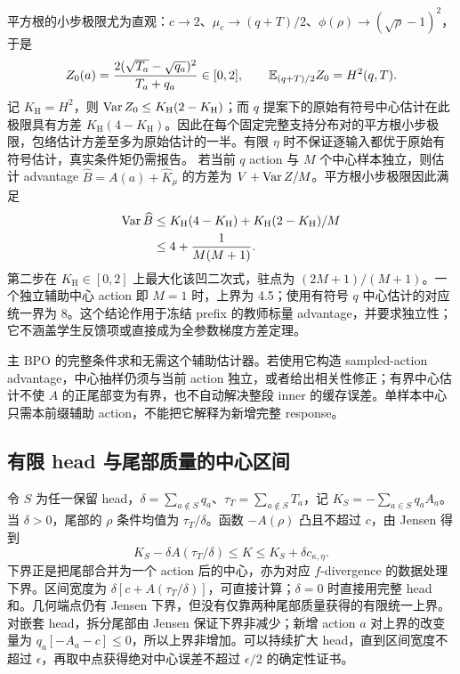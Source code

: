 平方根的小步极限尤为直观：$c\to2$、$\mu_c\to(q+T)/2$、$\phi(\rho)\to(\sqrt\rho-1)^2$，于是
\begin{equation}
 Z_0(a)=\frac{2(\sqrt{T_a}-\sqrt{q_a})^2}{T_a+q_a}\in[0,2],
 \qquad\mathbb E_{(q+T)/2}Z_0=H^2(q,T).
\end{equation}
记 $K_{\mathrm H}=H^2$，则 $\operatorname{Var} Z_0\le K_{\mathrm H}(2-K_{\mathrm H})$；而 $q$ 提案下的原始有符号中心估计在此极限具有方差 $K_{\mathrm H}(4-K_{\mathrm H})$。因此在每个固定完整支持分布对的平方根小步极限，包络估计方差至多为原始估计的一半。有限 $\eta$ 时不保证逐输入都优于原始有符号估计，真实条件矩仍需报告。 若当前 $q$ action 与 $M$ 个中心样本独立，则估计 advantage $\widehat B=A(a)+\widehat K_\mu$ 的方差为 $V+\operatorname{Var} Z/M$。平方根小步极限因此满足
\begin{align}
 \operatorname{Var}\widehat B
 &\le K_{\mathrm H}(4-K_{\mathrm H})
    +K_{\mathrm H}(2-K_{\mathrm H})/M\\
 &\le4+\frac1{M(M+1)}.
\end{align}
第二步在 $K_{\mathrm H}\in[0,2]$ 上最大化该凹二次式，驻点为 $(2M+1)/(M+1)$。一个独立辅助中心 action 即 $M=1$ 时，上界为 4.5；使用有符号 $q$ 中心估计的对应统一界为 8。这个结论作用于冻结 prefix 的教师标量 advantage，并要求独立性；它不涵盖学生反馈项或直接成为全参数梯度方差定理。


主 BPO 的完整条件求和无需这个辅助估计器。若使用它构造 sampled-action advantage，中心抽样仍须与当前 action 独立，或者给出相关性修正；有界中心估计不使 $A$ 的正尾部变为有界，也不自动解决整段 inner 的缓存误差。单样本中心只需本前缀辅助 action，不能把它解释为新增完整 response。
\subsection{有限 head 与尾部质量的中心区间}

令 $S$ 为任一保留 head，$\delta=\sum_{a\notin S}q_a$、$\tau_T=\sum_{a\notin S}T_a$，记 $K_S=-\sum_{a\in S}q_aA_a$。当 $\delta>0$，尾部的 $\rho$ 条件均值为 $\tau_T/\delta$。函数 $-A(\rho)$ 凸且不超过 $c$，由 Jensen 得到
\begin{equation}
 \boxed{K_S-\delta A(\tau_T/\delta)
 \le K\le K_S+\delta c_{\kappa,\eta}.}
 \label{eq:center-head-tail-interval}
\end{equation}
下界正是把尾部合并为一个 action 后的中心，亦为对应 $f$-divergence 的数据处理下界。区间宽度为 $\delta[c+A(\tau_T/\delta)]$，可直接计算；$\delta=0$ 时直接用完整 head 和。几何端点仍有 Jensen 下界，但没有仅靠两种尾部质量获得的有限统一上界。 对嵌套 head，拆分尾部由 Jensen 保证下界非减少；新增 action $a$ 对上界的改变量为 $q_a[-A_a-c]\le0$，所以上界非增加。可以持续扩大 head，直到区间宽度不超过 $\epsilon$，再取中点获得绝对中心误差不超过 $\epsilon/2$ 的确定性证书。

